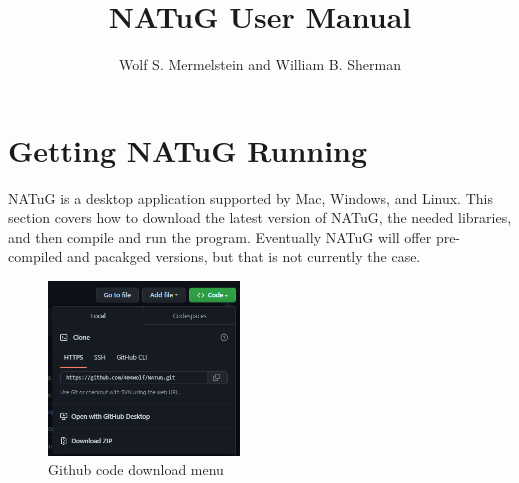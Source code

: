 \documentclass[
titlepage,
fontsize=12pt
]{article}
\title{NATuG User Manual}
\author{Wolf S. Mermelstein and William B. Sherman}
\begin{document}
	\maketitle
	\tableofcontents 
	\newpage
	
	\section{Getting NATuG Running}
	
	NATuG is a desktop application supported by Mac, Windows, and Linux. This section covers how to download the latest version of NATuG, the needed libraries, and then compile and run the program. Eventually NATuG will offer pre-compiled and pacakged versions, but that is not currently the case.
	
	\begin{figure}[h] 
		\centering
		\includegraphics[width=2in]{github-download-menu.png}
		\caption{Github code download menu}
		\label{fig:github-download-menu}
	\end{figure}
	
\end{document}
